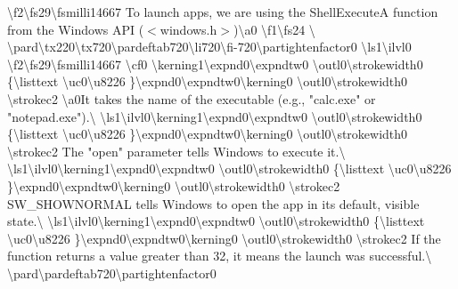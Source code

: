 \textbackslash{}f2\textbackslash{}fs29\textbackslash{}fsmilli14667 To launch apps, we are using the Shell\+ExecuteA function from the Windows API (\texorpdfstring{$<$}{<}windows.\+h\texorpdfstring{$>$}{>})\textbackslash{}\textquotesingle{}a0 \textbackslash{}f1\textbackslash{}fs24 \textbackslash{} \textbackslash{}pard\textbackslash{}tx220\textbackslash{}tx720\textbackslash{}pardeftab720\textbackslash{}li720\textbackslash{}fi-\/720\textbackslash{}partightenfactor0 \textbackslash{}ls1\textbackslash{}ilvl0 \textbackslash{}f2\textbackslash{}fs29\textbackslash{}fsmilli14667 \textbackslash{}cf0 \textbackslash{}kerning1\textbackslash{}expnd0\textbackslash{}expndtw0 \textbackslash{}outl0\textbackslash{}strokewidth0 \{\textbackslash{}listtext \textbackslash{}uc0\textbackslash{}u8226 \}\textbackslash{}expnd0\textbackslash{}expndtw0\textbackslash{}kerning0 \textbackslash{}outl0\textbackslash{}strokewidth0 \textbackslash{}strokec2 \textbackslash{}\textquotesingle{}a0\+It takes the name of the executable (e.\+g., {\ttfamily "{}calc.\+exe"{}} or {\ttfamily "{}notepad.\+exe"{}}).\textbackslash{} \textbackslash{}ls1\textbackslash{}ilvl0\textbackslash{}kerning1\textbackslash{}expnd0\textbackslash{}expndtw0 \textbackslash{}outl0\textbackslash{}strokewidth0 \{\textbackslash{}listtext \textbackslash{}uc0\textbackslash{}u8226 \}\textbackslash{}expnd0\textbackslash{}expndtw0\textbackslash{}kerning0 \textbackslash{}outl0\textbackslash{}strokewidth0 \textbackslash{}strokec2 The "{}open"{} parameter tells Windows to execute it.\textbackslash{} \textbackslash{}ls1\textbackslash{}ilvl0\textbackslash{}kerning1\textbackslash{}expnd0\textbackslash{}expndtw0 \textbackslash{}outl0\textbackslash{}strokewidth0 \{\textbackslash{}listtext \textbackslash{}uc0\textbackslash{}u8226 \}\textbackslash{}expnd0\textbackslash{}expndtw0\textbackslash{}kerning0 \textbackslash{}outl0\textbackslash{}strokewidth0 \textbackslash{}strokec2 SW\+\_\+\+SHOWNORMAL tells Windows to open the app in its default, visible state.\textbackslash{} \textbackslash{}ls1\textbackslash{}ilvl0\textbackslash{}kerning1\textbackslash{}expnd0\textbackslash{}expndtw0 \textbackslash{}outl0\textbackslash{}strokewidth0 \{\textbackslash{}listtext \textbackslash{}uc0\textbackslash{}u8226 \}\textbackslash{}expnd0\textbackslash{}expndtw0\textbackslash{}kerning0 \textbackslash{}outl0\textbackslash{}strokewidth0 \textbackslash{}strokec2 If the function returns a value greater than 32, it means the launch was successful.\textbackslash{} \textbackslash{}pard\textbackslash{}pardeftab720\textbackslash{}partightenfactor0


